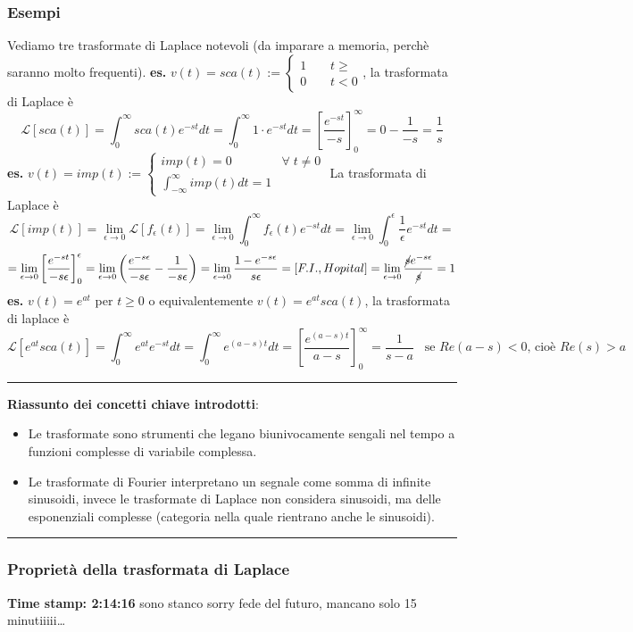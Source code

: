 \subsubsection{Esempi}
Vediamo tre trasformate di Laplace notevoli (da imparare a memoria, perchè saranno molto frequenti).\newline
\newline
\textbf{es.} $v(t) = sca(t) := \begin{cases}
    1 \;\;\;\; &t\geq\\ 0 &t<0 
\end{cases}$, la trasformata di Laplace è
\[
    \mathcal{L}[sca(t)] = \int_{0}^{\infty} sca(t)e^{-st} dt = \int_{0}^{\infty} 1 \cdot e^{-st}dt = \left[\frac{e^{-st}}{-s}\right]_0^\infty = 0 - \frac{1}{-s} = \frac{1}{s}
\]
\textbf{es.} $v(t) = imp(t) := \begin{cases}
    imp(t)=0 \;\;\;&\forall\;t \neq 0\\
    \int_{-\infty}^{\infty}imp(t) dt =1
\end{cases}$\newline
La trasformata di Laplace è
\[
    \mathcal{L}[imp(t)] = \lim_{\epsilon\rightarrow 0} \mathcal{L}[f_\epsilon(t)] = \lim_{\epsilon\rightarrow 0}\int_{0}^{\infty}f_\epsilon (t) e^{-st} dt = \lim_{\epsilon\rightarrow 0}\int_{0}^{\epsilon}\frac{1}{\epsilon}e^{-st}dt =
\]
\[
    = \lim_{\epsilon\rightarrow 0}\left[\frac{e^{-st}}{-s\epsilon}\right]_0^\epsilon = \lim_{\epsilon\rightarrow 0}\left( \frac{e^{-s\epsilon}}{-s\epsilon}- \frac{1}{-s\epsilon} \right) = \lim_{\epsilon\rightarrow 0} \frac{1- e^{-s \epsilon}}{s\epsilon} = [F.I., Hopital] = \lim_{\epsilon\rightarrow 0}\frac{\cancel{s}e^{-s\epsilon}}{\cancel{s}} = 1
\]
\textbf{es.} $v(t) = e^{at}$ per $t\geq 0$ o equivalentemente $v(t) = e^{at} sca(t)$, la trasformata di laplace è
\[
    \mathcal{L}[e^{at} sca(t)] = \int_{0}^{\infty}e^{at}e^{-st}dt = \int_{0}^{\infty}e^{(a-s)t}dt = \left[\frac{e^{(a-s)t}}{a-s}\right]_0^\infty = \frac{1}{s-a} \;\;\;\text{se $Re(a-s)<0$, cioè $Re(s)>a$}\;
\]
\rule{\textwidth}{0,4pt}\newline
\textbf{Riassunto dei concetti chiave introdotti}:
\begin{itemize}
    \item Le trasformate sono strumenti che legano biunivocamente sengali nel tempo a funzioni complesse di variabile complessa.
    \item Le trasformate di Fourier interpretano un segnale come somma di infinite sinusoidi, invece le trasformate di Laplace non considera sinusoidi, ma delle esponenziali complesse (categoria nella quale rientrano anche le sinusoidi).
\end{itemize}
\rule{\textwidth}{0,4pt}\newline
\subsubsection{Proprietà della trasformata di Laplace}
\textbf{Time stamp: 2:14:16} sono stanco sorry fede del futuro, mancano solo 15 minutiiiii\dots